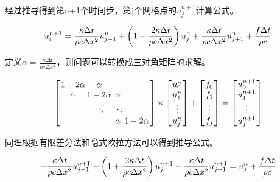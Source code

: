 \documentclass[final]{cvpr}
\begin{document}
经过推导得到第n+1个时间步，第j个网格点的$u_{j}^{n+1}$计算公式。
\begin{center}
	\begin{scriptsize}
	\begin{equation}
		\setlength{\abovedisplayskip}{-5pt}
		u_{i}^{n+1}=\frac{\kappa \Delta t}{\rho c \Delta x^{2}} u_{j-1}^{n}+\left(1-\frac{2\kappa \Delta t}{\rho c \Delta x^{2}}\right) u_{j}^{n} +\frac{\kappa \Delta t}{\rho c \Delta x^{2}} u_{j+1}^{n}+\frac{f \Delta t}{\rho c}
	\end{equation}
\end{scriptsize}
\end{center}

定义$\alpha=\frac{\kappa \Delta t}{\rho c \Delta x^{2}}$，则问题可以转换成三对角矩阵的求解。
\begin{center}
	\begin{scriptsize}
		\begin{equation}
			\setlength{\arraycolsep}{1pt}
			\setlength{\abovedisplayskip}{-5pt}
\left[\begin{array}{cccc}
	1-2 \alpha & \alpha& &  \\
	\alpha & 1-2\alpha & \alpha&  \\
	& \ddots & \ddots &  \\
	& &  \alpha& 1-2\alpha
\end{array}\right] \times\left[\begin{array}{c}
	u_{0}^{n} \\
	u_{1}^{n} \\
	\vdots \\
	u_{j}^{n}
\end{array}\right]+\left[\begin{array}{c}
	f_{0} \\
	f_{1} \\
	\vdots \\
	f_{j}
\end{array}\right]=\left[\begin{array}{c}
	u_{0}^{n+1} \\
	u_{1}^{n+1} \\
	\vdots \\
	u_{j}^{n+1}
\end{array}\right]
		\end{equation}
	\end{scriptsize}
\end{center}

同理根据有限差分法和隐式欧拉方法可以得到推导公式。
\begin{center}
	\begin{scriptsize}
		\begin{equation}
			\setlength{\abovedisplayskip}{-5pt}
-\frac{\kappa \Delta t}{\rho c \Delta x^{2}} u_{j-1}^{n+1}+\left(1+\frac{2\kappa \Delta t}{\rho c \Delta x^{2}}\right) u_{j}^{n+1}-\frac{\kappa \Delta t}{\rho c \Delta x^{2}} u_{j+1}^{n+1}=u_{j}^{n}+\frac{f \Delta t}{\rho c}
		\end{equation}
	\end{scriptsize}
\end{center}
\end{document}
